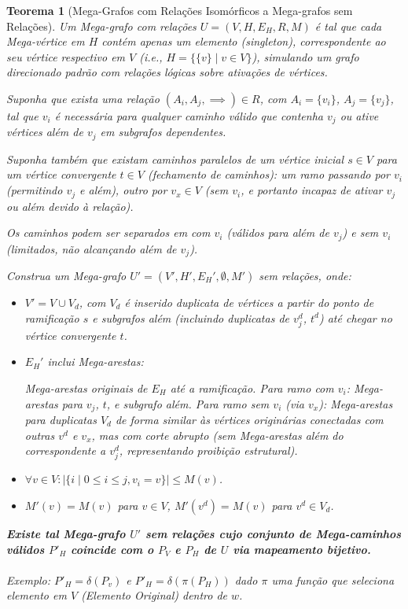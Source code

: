 \documentclass{article}
\newtheorem{theorem}{Teorema}
\begin{document}
\begin{theorem}[Mega-Grafos com Relações Isomórficos a Mega-grafos sem Relações]
Um Mega-grafo com relações \( U = (V, H, E_H, R, M) \) é tal que cada Mega-vértice em \( H \) contém apenas um elemento (singleton), correspondente ao seu vértice respectivo em \( V \) (i.e., \( H = \{ \{v\} \mid v \in V \} \)), simulando um grafo direcionado padrão com relações lógicas sobre ativações de vértices.

Suponha que exista uma relação \( (A_i, A_j, \implies) \in R \), com \( A_i = \{v_i\} \), \( A_j = \{v_j\} \), tal que \( v_i \) é necessária para qualquer caminho válido que contenha \( v_j \) ou ative vértices além de \( v_j \) em subgrafos dependentes.

Suponha também que existam caminhos paralelos de um vértice inicial \( s \in V \) para um vértice convergente \( t \in V \) (fechamento de caminhos): um ramo passando por \( v_i \) (permitindo \( v_j \) e além), outro por \( v_x \in V \) (sem \( v_i \), e portanto incapaz de ativar \( v_j \) ou além devido à relação).

Os caminhos podem ser separados em com \( v_i \) (válidos para além de \( v_j \)) e sem \( v_i \) (limitados, não alcançando além de \( v_j \)).

Construa um Mega-grafo \( U' = (V', H', E_H', \emptyset, M') \) sem relações, onde:

\begin{itemize}
    \item \( V' = V \cup V_d \), com \( V_d \) é inserido duplicata de vértices a partir do ponto de ramificação \( s \) e subgrafos além (incluindo duplicatas de \( v_j^d \), \( t^d \)) até chegar no vértice convergente \( t \).
    \item \( E_H' \) inclui Mega-arestas:

    \subitem Mega-arestas originais de \( E_H \) até a ramificação.
    \subitem Para ramo com \( v_i \): Mega-arestas para \( v_j \), \( t \), e subgrafo além.
    \subitem Para ramo sem \( v_i \) (via \( v_x \)): Mega-arestas para duplicatas \( V_d \) de forma similar às vértices originárias conectadas com outras \( v^d \) e \( v_x \), mas com corte abrupto (sem Mega-arestas além do correspondente a \( v_j^d \), representando proibição estrutural).

    \item \( \forall v \in V: |\{ i \mid 0 \leq i \leq j, v_i = v \}| \leq M(v) \).
    \item \( M'(v) = M(v) \) para \( v \in V \), \( M'(v^d) = M(v) \) para \( v^d \in V_d \).
\end{itemize}


\textbf{Existe tal Mega-grafo \( U' \) sem relações cujo conjunto de Mega-caminhos válidos \( P'_H \) coincide com o \( P_V \) e \( P_H \) de \( U \) via mapeamento bijetivo.}
\\
\\
Exemplo: \( P'_H = \delta(P_v) \) e \( P'_H = \delta(\pi(P_H)) \) dado \( \pi \) uma função que seleciona elemento em \( V \) (Elemento Original) dentro de \( w \).
\end{theorem}
\end{document}
